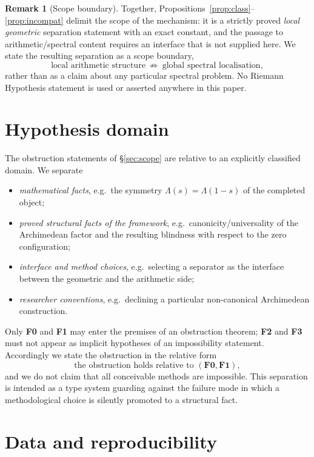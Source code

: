 \documentclass[11pt]{article}
\theoremstyle{definition}
\newtheorem{remark}[theorem]{Remark}
\begin{document}
\begin{remark}[Scope boundary]
Together, Propositions~\ref{prop:class}--\ref{prop:incompat} delimit the scope of the mechanism: it is a
strictly proved \emph{local geometric} separation statement with an exact constant, and the passage to
arithmetic/spectral content requires an interface that is not supplied here. We state the resulting
separation as a scope boundary,
\[
\text{local arithmetic structure}\ \not\Rightarrow\ \text{global spectral localisation},
\]
rather than as a claim about any particular spectral problem. No Riemann Hypothesis statement is used
or asserted anywhere in this paper.
\end{remark}

\section{Hypothesis domain}\label{sec:domain}

The obstruction statements of \S\ref{sec:scope} are relative to an explicitly classified domain. We separate
\begin{itemize}
\item[\textbf{F0}] \emph{mathematical facts}, e.g.\ the symmetry $\Lambda(s)=\Lambda(1-s)$ of the completed
object;
\item[\textbf{F1}] \emph{proved structural facts of the framework}, e.g.\ canonicity/universality of the
Archimedean factor and the resulting blindness with respect to the zero configuration;
\item[\textbf{F2}] \emph{interface and method choices}, e.g.\ selecting a separator as the interface between the
geometric and the arithmetic side;
\item[\textbf{F3}] \emph{researcher conventions}, e.g.\ declining a particular non-canonical Archimedean
construction.
\end{itemize}
Only \textbf{F0} and \textbf{F1} may enter the premises of an obstruction theorem; \textbf{F2} and \textbf{F3}
must not appear as implicit hypotheses of an impossibility statement. Accordingly we state the obstruction in
the relative form
\[
\text{the obstruction holds relative to } (\mathbf{F0},\mathbf{F1}),
\]
and we do not claim that all conceivable methods are impossible. This separation is intended as a type system
guarding against the failure mode in which a methodological choice is silently promoted to a structural fact.

\section{Data and reproducibility}\label{sec:data}
\end{document}

